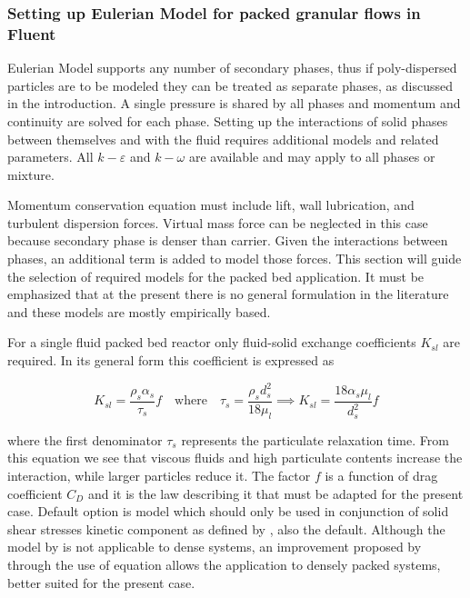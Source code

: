 \subsubsection{Setting up Eulerian Model for packed granular flows in Fluent}

Eulerian Model supports any number of secondary phases, thus if poly-dispersed particles are to be modeled they can be treated as separate phases, as discussed in the introduction. A single pressure is shared by all phases and momentum and continuity are solved for each phase. Setting up the interactions of solid phases between themselves and with the fluid requires additional models and related parameters. All $k-\varepsilon$ and $k-\omega$ are available and may apply to all phases or mixture.

Momentum conservation equation must include lift, wall lubrication, and turbulent dispersion forces. Virtual mass force can be neglected in this case because secondary phase is denser than carrier. Given the interactions between phases, an additional term is added to model those forces. This section will guide the selection of required models for the packed bed application. It must be emphasized that at the present there is no general formulation in the literature and these models are mostly empirically based.

For a single fluid packed bed reactor only fluid-solid exchange coefficients $K_{sl}$ are required. In its general form this coefficient is expressed as

\begin{equation}
K_{sl}=\frac{\rho_{s}\alpha_{s}}{\tau_{s}}f\quad\text{where}\quad\tau_{s}=\frac{\rho_{s}d_{s}^{2}}{18\mu_{l}}\implies{}K_{sl}=\frac{18\alpha_{s}\mu_{l}}{d_{s}^{2}}f
\end{equation}

\noindent{}where the first denominator $\tau_{s}$ represents the particulate relaxation time. From this equation we see that viscous fluids and high particulate contents increase the interaction, while larger particles reduce it. The factor $f$ is a function of drag coefficient $C_{D}$ and it is the law describing it that must be adapted for the present case. Default option is \textcite{Syamlal1989} model which should only be used in conjunction of solid shear stresses kinetic component as defined by \textcite{Syamlal1993}, also the default. Although the model by \textcite{Wen1966} is not applicable to dense systems, an improvement proposed by \textcite{Gidaspow1992} through the use of \textcite{Ergun1952} equation allows the application to densely packed systems, better suited for the present case.

